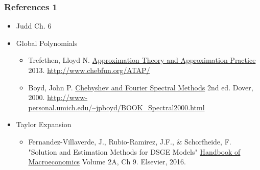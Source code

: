 \documentclass[bigger]{beamer}
\begin{document}
\begin{frame}%

\frametitle{References 1}

\begin{itemize}
\item Judd Ch. 6

\item Global Polynomials
\begin{itemize}
\item Trefethen, Lloyd N. \underline{Approximation Theory and Approximation } \underline{Practice} 2013. \url{http://www.chebfun.org/ATAP/}
\item Boyd, John P. \underline{Chebyshev and Fourier Spectral Methods} 2nd ed. Dover, 2000. \url{http://www-personal.umich.edu/~jpboyd/BOOK_Spectral2000.html}
\end{itemize}


\item Taylor Expansion
\begin{itemize}
\item Fernandez-Villaverde, J., Rubio-Ramirez, J.F., $\&$ Schorfheide, F. "Solution and Estimation Methods for DSGE Models" \underline{Handbook of Macroeconomics} Volume 2A, Ch 9. Elsevier, 2016.
\end{itemize}





\end{itemize}


\end{frame}%
\end{document}
